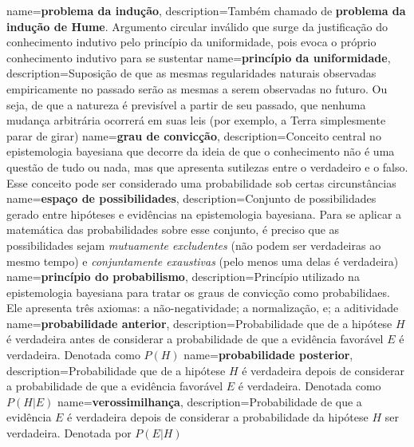 {
    name=\textbf{problema da indução},
    description={Também chamado de \textbf{problema da indução de Hume}. Argumento circular inválido que surge da justificação do conhecimento indutivo pelo princípio da uniformidade, pois evoca o próprio conhecimento indutivo para se sustentar}
}
{
    name=\textbf{princípio da uniformidade},
    description={Suposição de que as mesmas regularidades naturais observadas empiricamente no passado serão as mesmas a serem observadas no futuro. Ou seja, de que a natureza é previsível a partir de seu passado, que nenhuma mudança arbitrária ocorrerá em suas leis (por exemplo, a Terra simplesmente parar de girar)}
}
{
    name=\textbf{grau de convicção},
    description={Conceito central no epistemologia bayesiana que decorre da ideia de que o conhecimento não é uma questão de tudo ou nada, mas que apresenta sutilezas entre o verdadeiro e o falso. Esse conceito pode ser considerado uma probabilidade sob certas circunstâncias}
}
{
    name=\textbf{espaço de possibilidades},
    description={Conjunto de possibilidades gerado entre hipóteses e evidências na epistemologia bayesiana. Para se aplicar a matemática das probabilidades sobre esse conjunto, é preciso que as possibilidades sejam \textit{mutuamente excludentes} (não podem ser verdadeiras ao mesmo tempo) e \textit{conjuntamente exaustivas} (pelo menos uma delas é verdadeira)}
}
{
    name=\textbf{princípio do probabilismo},
    description={Princípio utilizado na epistemologia bayesiana para tratar os graus de convicção como probabilidaes. Ele apresenta três axiomas: a não-negatividade; a normalização, e; a aditividade}
}
{
    name=\textbf{probabilidade anterior},
    description={Probabilidade que de a hipótese $H$ é verdadeira antes de considerar a probabilidade de que a evidência favorável $E$ é verdadeira. Denotada como $P(H)$}
}
{
    name=\textbf{probabilidade posterior},
    description={Probabilidade que de a hipótese $H$ é verdadeira depois de considerar a probabilidade de que a evidência favorável $E$ é verdadeira. Denotada como $P(H | E)$}
}
{
    name=\textbf{verossimilhança},
    description={Probabilidade de que a evidência $E$ é verdadeira depois de considerar a probabilidade da hipótese $H$ ser verdadeira. Denotada por $P(E | H)$}
}
